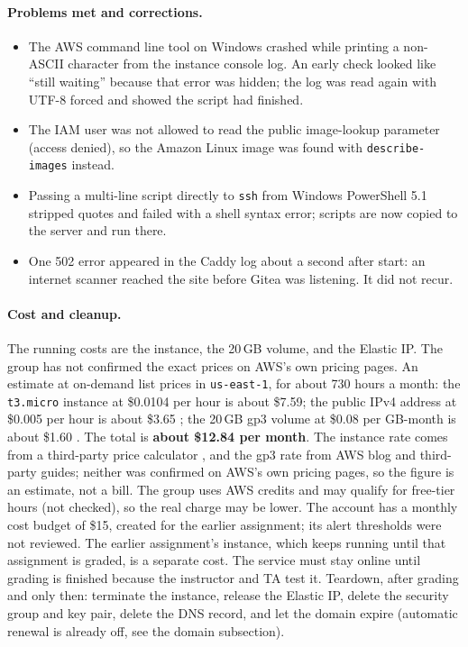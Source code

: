 \paragraph{Problems met and corrections.}
\begin{itemize}[nosep]
  \item The AWS command line tool on Windows crashed while printing a non-ASCII character from the instance console log. An early check looked like ``still waiting'' because that error was hidden; the log was read again with UTF-8 forced and showed the script had finished.
  \item The IAM user was not allowed to read the public image-lookup parameter (access denied), so the Amazon Linux image was found with \texttt{describe-images} instead.
  \item Passing a multi-line script directly to \texttt{ssh} from Windows PowerShell 5.1 stripped quotes and failed with a shell syntax error; scripts are now copied to the server and run there.
  \item One 502 error appeared in the Caddy log about a second after start: an internet scanner reached the site before Gitea was listening. It did not recur.
\end{itemize}

\paragraph{Cost and cleanup.}
The running costs are the instance, the 20\,GB volume, and the Elastic IP. The
group has not confirmed the exact prices on AWS's own pricing pages.
An estimate at on-demand list prices in \texttt{us-east-1}, for about 730 hours a
month: the \texttt{t3.micro} instance at \$0.0104 per hour is about \$7.59; the
public IPv4 address at \$0.005 per hour is about \$3.65 \cite{AWSIPv4Blog}; the
20\,GB gp3 volume at \$0.08 per GB-month is about \$1.60 \cite{AWSEbsGp3}. The
total is \textbf{about \$12.84 per month}. The instance rate comes from a
third-party price calculator \cite{HoloriT3Micro}, and the gp3 rate from AWS blog
and third-party guides; neither was confirmed on AWS's own pricing pages, so the
figure is an estimate, not a bill. The group uses AWS credits and may qualify for
free-tier hours (not checked), so the real charge may be lower. The account has a
monthly cost budget of \$15, created for the earlier assignment; its alert
thresholds were not reviewed. The earlier assignment's instance, which keeps
running until that assignment is graded, is a separate cost.
The service must stay online until grading is finished because the instructor
and TA test it. Teardown, after grading and only then: terminate the instance,
release the Elastic IP, delete the security group and key pair, delete the DNS
record, and let the domain expire (automatic renewal is already off, see the
domain subsection).

